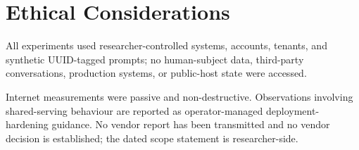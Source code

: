 \documentclass[journal,tifs]{IEEEtran}
\begin{document}
\section*{Ethical Considerations}
\label{app:ethics}

All experiments used researcher-controlled systems, accounts, tenants, and
synthetic UUID-tagged prompts; no human-subject data, third-party conversations,
production systems, or public-host state were accessed.

Internet measurements were passive and non-destructive. Observations involving
shared-serving behaviour are reported as operator-managed deployment-hardening
guidance. No vendor report has been transmitted and no vendor decision is
established; the dated scope statement is researcher-side.


\end{document}
